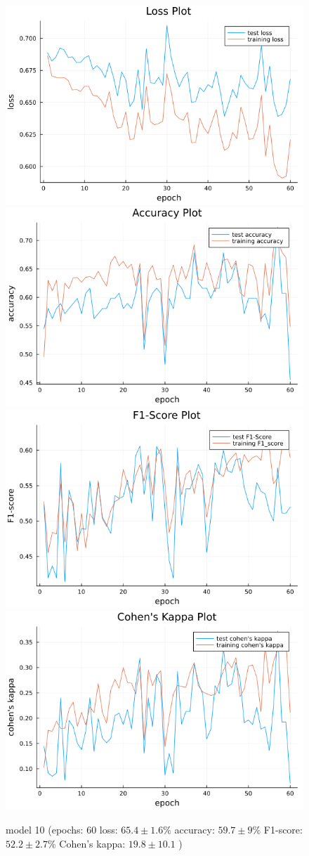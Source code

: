 \documentclass[
a4paper, 
12pt,
grayscalebody, %
abstract=on,
twoside, BCOR10mm, 12pt, DIV13,headinclude, footexclude, final, abstracton, openright
]{ibireprt}
\numberwithin{equation}{chapter}
\numberwithin{table}{chapter}
\numberwithin{figure}{chapter}
\numberwithin{algorithm}{chapter}
\numberwithin{example}{chapter}
\numberwithin{example}{chapter}
\begin{document}
\begin{figure}[h]
	\includegraphics[width=0.4\linewidth]{loss_png_final_3_2.png}\hfill
	\includegraphics[width=0.4\linewidth]{accuracy_png_final_3_2.png}
	\\[\smallskipamount]
	\includegraphics[width=0.4\linewidth]{f1_score_png_final_3_2.png}\hfill
	\includegraphics[width=0.4\linewidth]{cohens_kappa_png_final_3_2.png}
	\caption{model 10 (epochs: 60 loss: $65.4\pm1.6\% $ accuracy: $59.7\pm9\%$ F1-score: $52.2\pm2.7\%$  Cohen's kappa: $19.8\pm10.1$ )}
	\label{fig:model_10_60}
\end{figure}
\end{document}
